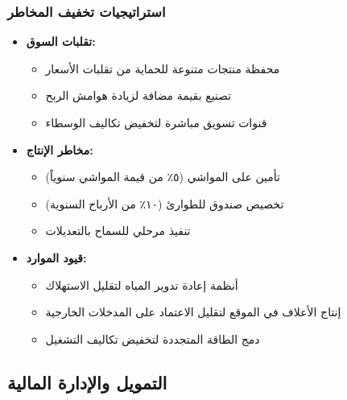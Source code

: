 \subsubsection{استراتيجيات تخفيف المخاطر}
\begin{itemize}
    \item \textbf{تقلبات السوق:}
    \begin{itemize}
        \item محفظة منتجات متنوعة للحماية من تقلبات الأسعار
        \item تصنيع بقيمة مضافة لزيادة هوامش الربح
        \item قنوات تسويق مباشرة لتخفيض تكاليف الوسطاء
    \end{itemize}
    
    \item \textbf{مخاطر الإنتاج:}
    \begin{itemize}
        \item تأمين على المواشي (٥٪ من قيمة المواشي سنوياً)
        \item تخصيص صندوق للطوارئ (١٠٪ من الأرباح السنوية)
        \item تنفيذ مرحلي للسماح بالتعديلات
    \end{itemize}
    
    \item \textbf{قيود الموارد:}
    \begin{itemize}
        \item أنظمة إعادة تدوير المياه لتقليل الاستهلاك
        \item إنتاج الأعلاف في الموقع لتقليل الاعتماد على المدخلات الخارجية
        \item دمج الطاقة المتجددة لتخفيض تكاليف التشغيل
    \end{itemize}
\end{itemize}

\subsection{التمويل والإدارة المالية}

